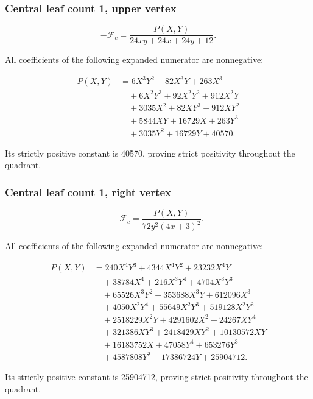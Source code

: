 \documentclass[11pt,letterpaper]{article}
\theoremstyle{plain}
\begin{document}
\par\noindent\begin{minipage}{\linewidth}
\subsubsection*{Central leaf count 1, upper vertex}\label{central-leaf-count-1-upper-vertex}

\[
-\mathcal F_c=\frac{P(X,Y)}{24 x y + 24 x + 24 y + 12}.
\]

All coefficients of the following expanded numerator are nonnegative:

\[
\begin{aligned}
P(X,Y)&=6 X^{3} Y^{2} + 82 X^{3} Y + 263 X^{3} \\
&\quad + 6 X^{2} Y^{3} + 92 X^{2} Y^{2} + 912 X^{2} Y \\
&\quad + 3035 X^{2} + 82 X Y^{3} + 912 X Y^{2} \\
&\quad + 5844 X Y + 16729 X + 263 Y^{3} \\
&\quad + 3035 Y^{2} + 16729 Y + 40570.
\end{aligned}
\]

Its strictly positive constant is 40570, proving strict positivity throughout the quadrant.
\end{minipage}\par\medskip

\par\noindent\begin{minipage}{\linewidth}
\subsubsection*{Central leaf count 1, right vertex}\label{central-leaf-count-1-right-vertex}

\[
-\mathcal F_c=\frac{P(X,Y)}{72 y^{2} \left(4 x + 3\right)^{2}}.
\]

All coefficients of the following expanded numerator are nonnegative:

\[
\begin{aligned}
P(X,Y)&=240 X^{4} Y^{3} + 4344 X^{4} Y^{2} + 23232 X^{4} Y \\
&\quad + 38784 X^{4} + 216 X^{3} Y^{4} + 4704 X^{3} Y^{3} \\
&\quad + 65526 X^{3} Y^{2} + 353688 X^{3} Y + 612096 X^{3} \\
&\quad + 4050 X^{2} Y^{4} + 55649 X^{2} Y^{3} + 519128 X^{2} Y^{2} \\
&\quad + 2518229 X^{2} Y + 4291602 X^{2} + 24267 X Y^{4} \\
&\quad + 321386 X Y^{3} + 2418429 X Y^{2} + 10130572 X Y \\
&\quad + 16183752 X + 47058 Y^{4} + 653276 Y^{3} \\
&\quad + 4587808 Y^{2} + 17386724 Y + 25904712.
\end{aligned}
\]

Its strictly positive constant is 25904712, proving strict positivity throughout the quadrant.
\end{minipage}\par\medskip
\end{document}
